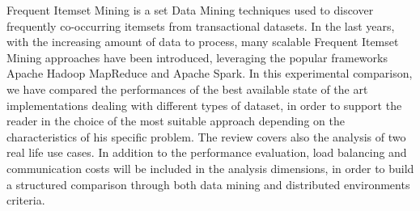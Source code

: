 Frequent Itemset Mining is a set Data Mining techniques used to discover frequently co-occurring itemsets from transactional datasets. In the last years, with the increasing amount of data to process, many scalable Frequent Itemset Mining approaches have been introduced, leveraging the popular frameworks Apache Hadoop MapReduce and Apache Spark. 
In this experimental comparison, we have compared the performances of the best available state of the art implementations dealing with different types of dataset, in order to support the reader in the choice of the most suitable approach depending on the characteristics of his specific problem. The review covers also the analysis of two real life use cases.
In addition to the performance evaluation, load balancing and communication costs will be included in the analysis dimensions, in order to build a structured comparison through both data mining and distributed environments criteria.